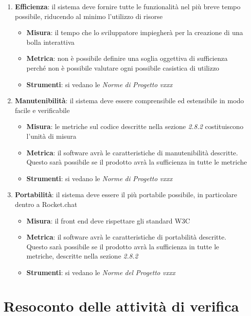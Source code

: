 {\begin{enumerate}
  \item \textbf{Efficienza}: il sistema deve fornire tutte le funzionalità nel più breve tempo possibile,
  riducendo al minimo l’utilizzo di risorse
  \begin{itemize}
    \item \textbf{Misura}: il tempo che lo sviluppatore impiegherà per la creazione di una bolla interattiva
    \item \textbf{Metrica}: non è possibile definire una soglia oggettiva di sufficienza perché non è possibile valutare ogni possibile casistica di utilizzo
    \item \textbf{Strumenti}: si vedano le  \emph{Norme di Progetto vxxx} 
  \end{itemize}
  
  \item \textbf{Manutenibilità}: il sistema deve essere comprensibile ed estensibile in modo facile e verificabile
  \begin{itemize}
    \item \textbf{Misura}: le metriche sul codice descritte nella sezione \emph{2.8.2}
    costituiscono l'unità di misura
    \item \textbf{Metrica}: il software avrà le caratteristiche di manutenibilità descritte. Questo sarà possibile se il prodotto avrà la sufficienza in tutte le metriche
    \item \textbf{Strumenti}: si vedano le  \emph{Norme di Progetto vxxx} 
  \end{itemize}
  
  \item \textbf{Portabilità}: il sistema deve essere il più portabile possibile, in particolare dentro a Rocket.chat
  \begin{itemize}
    \item \textbf{Misura}: il front end deve rispettare gli standard W3C
    \item \textbf{Metrica}: il software avrà le caratteristiche di
    portabilità descritte. Questo sarà possibile se il prodotto
    avrà la sufficienza in tutte le metriche, descritte nella sezione \emph{2.8.2}
    \item \textbf{Strumenti}: si vedano le \emph{Norme del Progetto vxxx}
  \end{itemize}
\end{enumerate}




\section{Resoconto delle attività di verifica}

}

